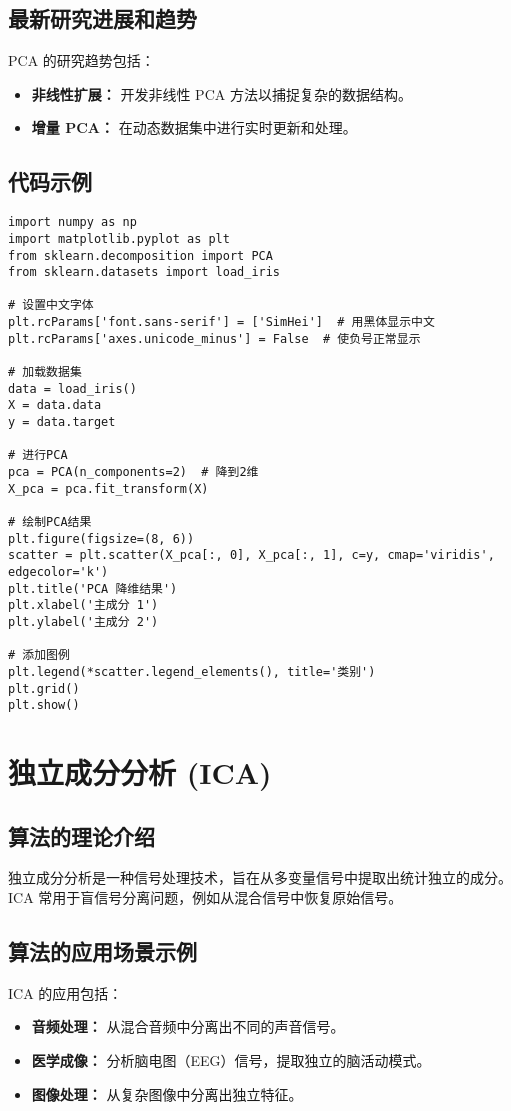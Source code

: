 \subsection*{最新研究进展和趋势}
PCA 的研究趋势包括：
\begin{itemize}
    \item \textbf{非线性扩展：} 开发非线性 PCA 方法以捕捉复杂的数据结构。
    \item \textbf{增量 PCA：} 在动态数据集中进行实时更新和处理。
\end{itemize}
\subsection*{代码示例}
\begin{lstlisting}
import numpy as np
import matplotlib.pyplot as plt
from sklearn.decomposition import PCA
from sklearn.datasets import load_iris

# 设置中文字体
plt.rcParams['font.sans-serif'] = ['SimHei']  # 用黑体显示中文
plt.rcParams['axes.unicode_minus'] = False  # 使负号正常显示

# 加载数据集
data = load_iris()
X = data.data
y = data.target

# 进行PCA
pca = PCA(n_components=2)  # 降到2维
X_pca = pca.fit_transform(X)

# 绘制PCA结果
plt.figure(figsize=(8, 6))
scatter = plt.scatter(X_pca[:, 0], X_pca[:, 1], c=y, cmap='viridis', edgecolor='k')
plt.title('PCA 降维结果')
plt.xlabel('主成分 1')
plt.ylabel('主成分 2')

# 添加图例
plt.legend(*scatter.legend_elements(), title='类别')
plt.grid()
plt.show()

\end{lstlisting}


\section{独立成分分析 (ICA)}
\subsection*{算法的理论介绍}
独立成分分析是一种信号处理技术，旨在从多变量信号中提取出统计独立的成分。ICA 常用于盲信号分离问题，例如从混合信号中恢复原始信号。

\subsection*{算法的应用场景示例}
ICA 的应用包括：
\begin{itemize}
    \item \textbf{音频处理：} 从混合音频中分离出不同的声音信号。
    \item \textbf{医学成像：} 分析脑电图（EEG）信号，提取独立的脑活动模式。
    \item \textbf{图像处理：} 从复杂图像中分离出独立特征。
\end{itemize}


